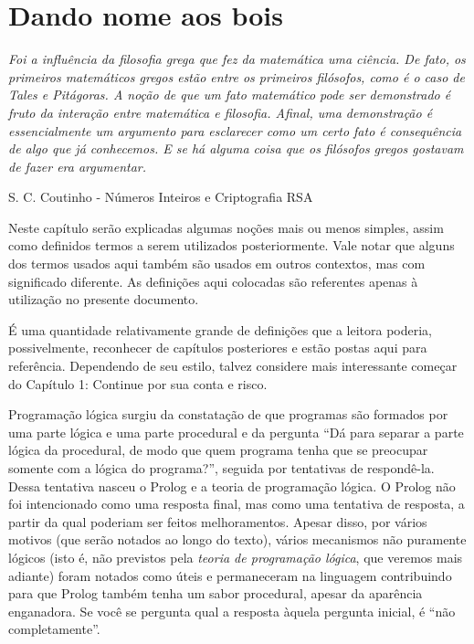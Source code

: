 \documentclass{article}
\theoremstyle{remark}
\begin{document}
\section{Dando nome aos bois}

\epigraph{\textit{Foi a influência da filosofia grega que fez da matemática uma ciência. De fato, os primeiros matemáticos gregos estão entre os primeiros filósofos, como é o caso de Tales e Pitágoras. A noção de que um fato matemático pode ser demonstrado é fruto da interação entre matemática e filosofia. Afinal, uma demonstração é essencialmente um argumento para esclarecer como um certo fato é consequência de algo que já conhecemos. E se há alguma coisa que os filósofos gregos gostavam de
    fazer era argumentar.}}{S. C. Coutinho - Números Inteiros e Criptografia RSA}


Neste capítulo serão explicadas algumas noções mais ou menos simples, assim como definidos termos a serem utilizados posteriormente. Vale notar que alguns dos termos usados aqui também são usados em outros contextos, mas com significado diferente. As definições aqui colocadas são referentes apenas à utilização no presente documento.\par
É uma quantidade relativamente grande de definições que a leitora poderia, possivelmente, reconhecer de capítulos posteriores e estão postas aqui para referência. Dependendo de seu estilo, talvez considere mais interessante começar do Capítulo 1: Continue por sua conta e risco. %

Programação lógica surgiu da constatação de que programas são formados por uma parte lógica e uma parte procedural e da pergunta ``Dá para separar a parte lógica da procedural, de modo que quem programa tenha que se preocupar somente com a lógica do programa?'', seguida por tentativas de respondê-la. Dessa tentativa nasceu o Prolog e a teoria de programação lógica. O Prolog não foi intencionado %
como uma resposta final, mas como uma tentativa de resposta, a partir da qual poderiam ser feitos
melhoramentos. Apesar disso, por vários motivos (que serão notados ao longo do texto), vários mecanismos não puramente lógicos (isto é, não previstos pela \textit{teoria de programação lógica}, que veremos mais adiante) foram notados como úteis e permaneceram na linguagem contribuindo para que Prolog também tenha um sabor procedural, apesar da aparência enganadora. Se você se pergunta qual a resposta àquela pergunta inicial, é ``não completamente''.\par
\end{document}
